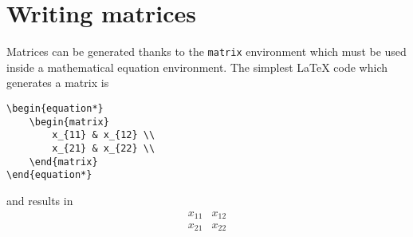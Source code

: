 	
%	
		
	
\section{Writing matrices}

	Matrices can be generated thanks to the \texttt{matrix} environment which must be used inside a mathematical equation environment.
	The simplest \LaTeX{} code which generates a matrix is
\begin{lstlisting}[language={[LaTeX]TeX}]
\begin{equation*}
	\begin{matrix}
		x_{11} & x_{12} \\
		x_{21} & x_{22} \\
	\end{matrix} 
\end{equation*}
\end{lstlisting}
	and results in
	\begin{equation*}
		\begin{matrix}
			x_{11} & x_{12} \\
			x_{21} & x_{22} \\
		\end{matrix}
	\end{equation*}
	
